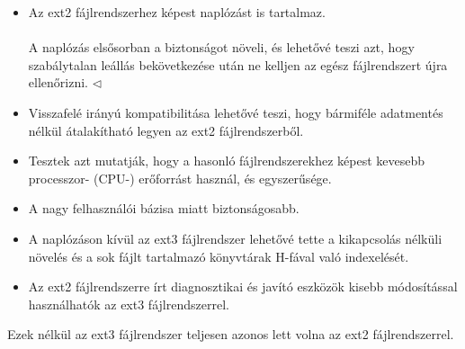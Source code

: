 \documentclass[tikz,12pt,margin=0px]{article}
\begin{document}
    \begin{itemize}[topsep=8pt,itemsep=4pt,partopsep=4pt, parsep=4pt]
        \item Az ext2 fájlrendszerhez képest naplózást is tartalmaz.\\\\
        {\footnotesize \noindent {\color{blue} \faLightbulbO\ $\triangleright$ } }
        {\footnotesize
        A naplózás elsősorban a biztonságot növeli, és lehetővé teszi azt, hogy szabálytalan leállás bekövetkezése után ne kelljen az egész fájlrendszert újra ellenőrizni.
        $\triangleleft$ \faLightbulbO}
        \item Visszafelé irányú kompatibilitása lehetővé teszi, hogy bármiféle adatmentés nélkül átalakítható legyen az ext2 fájlrendszerből.
        \item Tesztek azt mutatják, hogy a hasonló fájlrendszerekhez képest kevesebb processzor- (CPU-) erőforrást használ, és egyszerűsége.
        \item A nagy felhasználói bázisa miatt biztonságosabb.
        \item A naplózáson kívül az ext3 fájlrendszer lehetővé tette a kikapcsolás nélküli növelés és a sok fájlt tartalmazó könyvtárak H-fával való indexelését.
        \item Az ext2 fájlrendszerre írt diagnosztikai és javító eszközök kisebb módosítással használhatók az ext3 fájlrendszerrel.
    \end{itemize}

    \noindent Ezek nélkül az ext3 fájlrendszer teljesen azonos lett volna az ext2 fájlrendszerrel.\\
\end{document}
